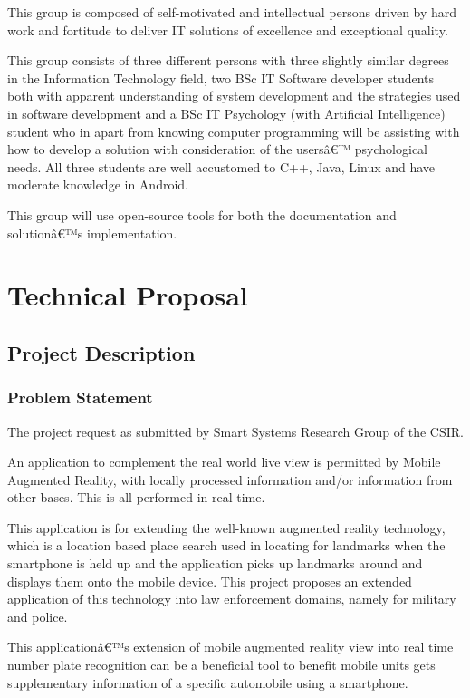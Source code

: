 \documentclass[a4paper]{article}
\begin{document}
		This group is composed of self-motivated and intellectual persons driven by hard work and 			fortitude to deliver IT solutions of excellence and exceptional quality.

		This group consists of three different persons with three slightly similar degrees in the 			Information Technology field, two BSc IT Software developer students both with apparent 			understanding of system development and the strategies used in software development and a 			BSc IT Psychology (with Artificial Intelligence) student who in apart from knowing 					computer programming will be assisting with how to develop a solution with consideration 			of the usersâ€™ psychological needs. All three students are well accustomed to C++, Java, 			Linux and have moderate knowledge in Android. 

		This group will use open-source tools for both the documentation and solutionâ€™s 					implementation.


	\section{Technical Proposal}

		\subsection{Project Description}

			\subsubsection{Problem Statement}
			The project request as submitted by Smart Systems Research Group of the CSIR.

An application to complement the real world live view is permitted by Mobile Augmented Reality, with locally processed information and/or information from other bases.  This is all performed in real time. 

This application is for extending the well-known augmented reality technology, which is a location based place search used in locating for landmarks when the smartphone is held up and the application picks up landmarks around and displays them onto the mobile device. This project proposes an extended application of this technology into law enforcement domains, namely for military and police. 

This applicationâ€™s extension of mobile augmented reality view into real time number plate recognition can be a beneficial tool to benefit mobile units gets supplementary information of a specific automobile using a smartphone. 
\end{document}
